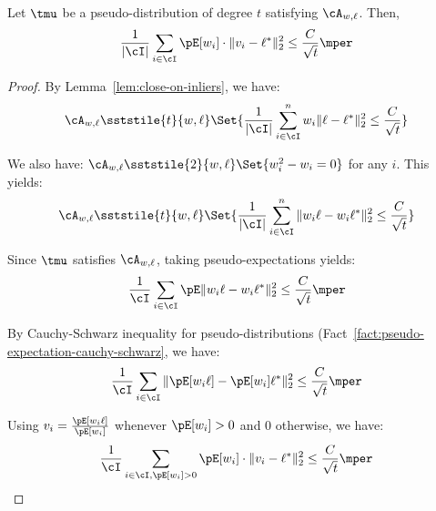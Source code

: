 \begin{lemma}
Let $\tmu$ be a pseudo-distribution of degree $t$ satisfying $\cA_{w,\ell}$. Then, 
\[
\frac{1}{|\cI|} \sum_{i \in \cI} \pE[w_i] \cdot \|v_i -\ell^*\|_2^2 \leq \frac{C}{\sqrt{t}} \mper
\]
\label{lem:votes-are-close}
\end{lemma}
\begin{proof}
By Lemma~\ref{lem:close-on-inliers}, we have:
\[
\cA_{w,\ell} \sststile{t}{w,\ell} \Set{\frac{1}{|\cI|}\sum_{i \in \cI}^n w_i \|\ell - \ell^*\|^2_2\leq \frac{C}{\sqrt{t}}}
\]


We also have: $\cA_{w,\ell} \sststile{2}{w,\ell} \Set{w_i^2 - w_i =0}$ for any $i$. This yields:
\[
\cA_{w,\ell} \sststile{t}{w,\ell} \Set{\frac{1}{|\cI|}\sum_{i \in \cI}^n \|w_i\ell - w_i\ell^*\|^2_2\leq \frac{C}{\sqrt{t}}}
\]



Since $\tmu$ satisfies $\cA_{w,\ell}$, taking pseudo-expectations yields:
\[
 \frac{1}{\cI} \sum_{i \in \cI}\pE \| w_i\ell  - w_i \ell^*\|_2^2 \leq \frac{C}{\sqrt{t}} \mper
 \]

By Cauchy-Schwarz inequality for pseudo-distributions (Fact~\ref{fact:pseudo-expectation-cauchy-schwarz}, we have:
\[
 \frac{1}{\cI} \sum_{i \in \cI} \| \pE[w_i\ell]  - \pE[w_i] \ell^*\|_2^2 \leq \frac{C}{\sqrt{t}} \mper
 \]


Using $v_i = \frac{\pE[w_i \ell]}{\pE[w_i]}$ whenever $\pE[w_i] >0$ and $0$ otherwise, we have:
\[
 \frac{1}{\cI} \sum_{i \in \cI, \pE[w_i] > 0} \pE[w_i]\cdot \|v_i -  \ell^*\|_2^2 \leq \frac{C}{\sqrt{t}} \mper
 \]


\end{proof}











